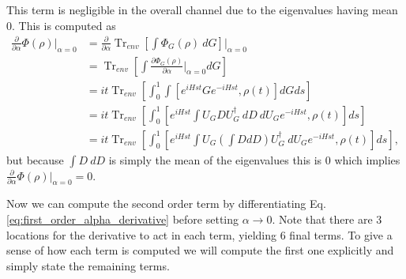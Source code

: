\documentclass{article}
\newcommand{\parens}[1]{\left( #1 \right)}
\newcommand{\brackets}[1]{\left[ #1 \right]}
\DeclareMathOperator{\Tr}{Tr}
\newcommand{\partrace}[2]{\Tr_{#1} \brackets{ #2 }}
\begin{document}
This term is negligible in the overall channel due to the eigenvalues having mean 0. This is computed as
\begin{align}
    \frac{\partial}{\partial \alpha} \Phi(\rho) \bigg|_{\alpha = 0} &= \frac{\partial}{\partial \alpha} \partrace{env}{\int \Phi_G(\rho) ~dG} \bigg|_{\alpha=0} \\
    &= \partrace{env}{\int\frac{\partial \Phi_G(\rho)}{\partial \alpha} \bigg|_{\alpha=0} dG } \\
    &= i t \partrace{env}{\int_0^1 \int [e^{i H s t} G e^{-i H s t}, \rho(t)] dG ds} \\
    &= i t \partrace{env}{\int_0^1  [e^{i H s t} \int U_G D U_G^\dagger ~ dD ~ dU_G e^{-i H s t}, \rho(t)] ds} \\
    &= i t \partrace{env}{\int_0^1  [e^{i H s t} \int U_G \parens{\int D dD} U_G^\dagger ~ dU_G e^{-i H s t}, \rho(t)] ds},
\end{align}
but because $\int D ~dD$ is simply the mean of the eigenvalues this is 0 which implies $\frac{\partial}{\partial \alpha} \Phi(\rho) \big|_{\alpha = 0} = 0$. 

Now we can compute the second order term by differentiating Eq. \eqref{eq:first_order_alpha_derivative} before setting $\alpha \to 0$. Note that there are 3 locations for the derivative to act in each term, yielding 6 final terms. To give a sense of how each term is computed we will compute the first one explicitly and simply state the remaining terms.
\end{document}
